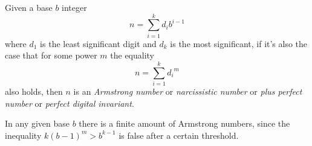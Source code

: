 \documentclass[12pt]{article}
\begin{document}
Given a base $b$ integer $$n = \sum_{i = 1}^k d_ib^{i - 1}$$ where $d_1$ is the least significant digit and $d_k$ is the most significant, if it's also the case that for some power $m$ the equality $$n = \sum_{i = 1}^k {d_i}^m$$ also holds, then $n$ is an {\em Armstrong number} or {\em narcissistic number} or {\em plus perfect number} or {\em perfect digital invariant}.

In any given base $b$ there is a finite amount of Armstrong numbers, since the inequality $k(b - 1)^m > b^{k - 1}$ is false after a certain threshold.
\end{document}
